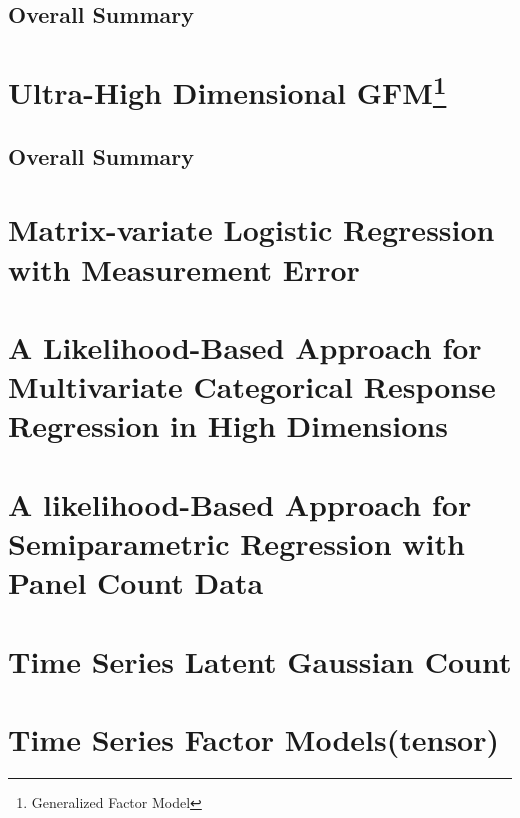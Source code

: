 \documentclass{article}[12pt]
\begin{document}
\subsection{Overall Summary}

\section [Ultra-High Dimensional GFM]{Ultra-High Dimensional GFM\footnote{Generalized Factor Model}} 

\subsection{Overall Summary} 

\section{Matrix-variate Logistic Regression with Measurement Error}

\section{A Likelihood-Based Approach for Multivariate Categorical Response Regression in High Dimensions}

\section{A likelihood-Based Approach for Semiparametric Regression with Panel Count Data}


\section{Time Series Latent Gaussian Count}

\section{Time Series Factor Models(tensor)}   
\end{document}
